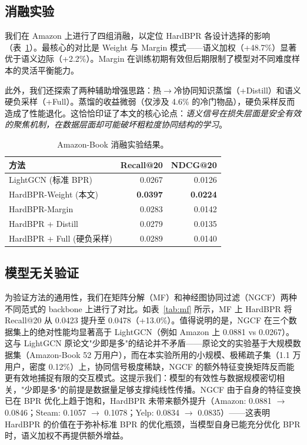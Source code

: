 \documentclass[11pt,a4paper]{article}
\begin{document}
\subsection{消融实验}

我们在 Amazon 上进行了四组消融，以定位 HardBPR 各设计选择的影响（表~\ref{tab:ablation}）。最核心的对比是 Weight 与 Margin 模式——语义加权（+48.7\%）显著优于语义边际（+2.2\%）。Margin 在训练初期有效但后期限制了模型对不同难度样本的灵活平衡能力。

此外，我们还探索了两种辅助增强思路：热$\to$冷协同知识蒸馏（+Distill）和语义硬负采样（+Full）。蒸馏的收益微弱（仅涉及 4.6\% 的冷门物品），硬负采样反而造成了性能退化。这恰恰印证了本文的核心论点：\emph{语义信号在损失层面是安全有效的聚焦机制，在数据层面却可能破坏粗粒度协同结构的学习}。

\begin{table}[ht]
    \centering
    \caption{Amazon-Book 消融实验结果。}
    \label{tab:ablation}
    \begin{tabular}{lrr}
        \toprule
        方法 & Recall@20 & NDCG@20 \\
        \midrule
        LightGCN (标准 BPR) & 0.0267 & 0.0126 \\
        HardBPR-Weight (本文) & \textbf{0.0397} & \textbf{0.0224} \\
        HardBPR-Margin & 0.0283 & 0.0142 \\
        HardBPR + Distill & 0.0279 & 0.0135 \\
        HardBPR + Full (硬负采样) & 0.0289 & 0.0140 \\
        \bottomrule
    \end{tabular}
\end{table}

\subsection{模型无关验证}

为验证方法的通用性，我们在矩阵分解（MF）和神经图协同过滤（NGCF）两种不同范式的 backbone 上进行了对比。如表~\ref{tab:mf} 所示，MF 上 HardBPR 将 Recall@20 从 0.0423 提升至 0.0478（+13.0\%）。值得说明的是，NGCF 在三个数据集上的绝对性能均显著高于 LightGCN（例如 Amazon 上 0.0881 vs 0.0267）。这与 LightGCN 原论文"少即是多"的结论并不矛盾——原论文的实验基于大规模数据集（Amazon-Book 52 万用户），而在本实验所用的小规模、极稀疏子集（1.1 万用户，密度 0.12\%）上，协同信号极度稀缺，NGCF 的额外特征变换矩阵反而能更有效地捕捉有限的交互模式。这提示我们：模型的有效性与数据规模密切相关，"少即是多"的前提是数据量足够支撑纯线性传播。NGCF 由于自身的特征变换已在 BPR 优化上趋于饱和，HardBPR 未带来额外提升（Amazon: 0.0881 $\to$ 0.0846；Steam: 0.1057 $\to$ 0.1078；Yelp: 0.0834 $\to$ 0.0835）——这表明 HardBPR 的价值在于弥补标准 BPR 的优化瓶颈，当模型自身已能充分优化 BPR 时，语义加权不再提供额外增益。
\end{document}
